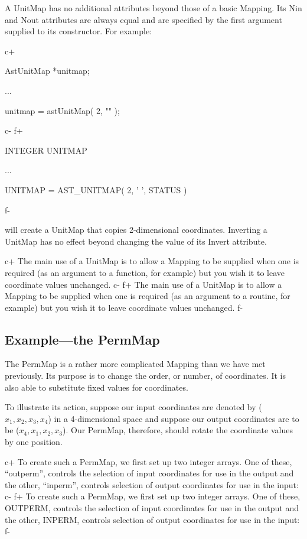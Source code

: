 \documentclass[twoside,11pt]{starlink}
\begin{document}
A UnitMap has no additional attributes beyond those of a basic
Mapping. Its Nin and Nout attributes are always equal and are
specified by the first argument supplied to its constructor. For
example:

c+
\small
\begin{terminalv}
AstUnitMap *unitmap;

...

unitmap = astUnitMap( 2, "" );
\end{terminalv}
\normalsize
c-
f+
\small
\begin{terminalv}
      INTEGER UNITMAP

      ...

      UNITMAP = AST_UNITMAP( 2, ' ', STATUS )
\end{terminalv}
\normalsize
f-

will create a UnitMap that copies 2-dimensional coordinates. Inverting
a UnitMap has no effect beyond changing the value of its Invert
attribute.

c+
The main use of a UnitMap is to allow a Mapping to be supplied when one
is required (as an argument to a function, for example) but you wish
it to leave coordinate values unchanged.
c-
f+
The main use of a UnitMap is to allow a Mapping to be supplied when one
is required (as an argument to a routine, for example) but you wish
it to leave coordinate values unchanged.
f-

\subsection{\label{ss:permmapexample}Example---the PermMap}

The PermMap is a rather more complicated Mapping than we have met
previously.  Its purpose is to change the order, or number, of
coordinates. It is also able to substitute fixed values for
coordinates.

To illustrate its action, suppose our input coordinates are denoted by
($x_1,x_2,x_3,x_4$) in a 4-dimensional space and suppose our output
coordinates are to be ($x_4,x_1,x_2,x_3$). Our PermMap, therefore,
should rotate the coordinate values by one position.

c+
To create such a PermMap, we first set up two integer arrays. One of
these, ``outperm'', controls the selection of input coordinates for
use in the output and the other, ``inperm'', controls selection of
output coordinates for use in the input:
c-
f+
To create such a PermMap, we first set up two integer arrays. One of
these, OUTPERM, controls the selection of input coordinates for use in
the output and the other, INPERM, controls selection of output
coordinates for use in the input:
f-
\end{document}
